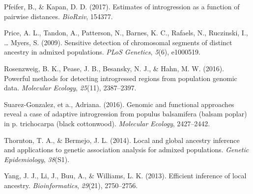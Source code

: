 \documentclass[12pt,twoside]{reedthesis}
\begin{document}
  \hypertarget{ref-pfeifer2017estimates}{}
  Pfeifer, B., \& Kapan, D. D. (2017). Estimates of introgression as a
  function of pairwise distances. \emph{BioRxiv}, 154377.
  
  \hypertarget{ref-price2009sensitive}{}
  Price, A. L., Tandon, A., Patterson, N., Barnes, K. C., Rafaels, N.,
  Ruczinski, I., \ldots{} Myers, S. (2009). Sensitive detection of
  chromosomal segments of distinct ancestry in admixed populations.
  \emph{PLoS Genetics}, \emph{5}(6), e1000519.
  
  \hypertarget{ref-rosenzweig2016powerful}{}
  Rosenzweig, B. K., Pease, J. B., Besansky, N. J., \& Hahn, M. W. (2016).
  Powerful methods for detecting introgressed regions from population
  genomic data. \emph{Molecular Ecology}, \emph{25}(11), 2387--2397.
  
  \hypertarget{ref-suarez2016}{}
  Suarez-Gonzalez, et a., Adriana. (2016). Genomic and functional
  approaches reveal a case of adaptive introgression from populus
  balsamifera (balsam poplar) in p. trichocarpa (black cottonwood).
  \emph{Molecular Ecology}, 2427--2442.
  
  \hypertarget{ref-thornton2014local}{}
  Thornton, T. A., \& Bermejo, J. L. (2014). Local and global ancestry
  inference and applications to genetic association analysis for admixed
  populations. \emph{Genetic Epidemiology}, \emph{38}(S1).
  
  \hypertarget{ref-yang2013efficient}{}
  Yang, J. J., Li, J., Buu, A., \& Williams, L. K. (2013). Efficient
  inference of local ancestry. \emph{Bioinformatics}, \emph{29}(21),
  2750--2756.
  
\end{document}
